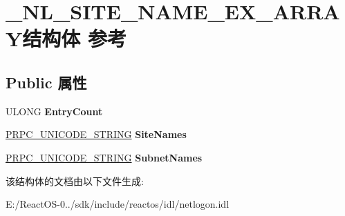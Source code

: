 \hypertarget{struct___n_l___s_i_t_e___n_a_m_e___e_x___a_r_r_a_y}{}\section{\+\_\+\+N\+L\+\_\+\+S\+I\+T\+E\+\_\+\+N\+A\+M\+E\+\_\+\+E\+X\+\_\+\+A\+R\+R\+A\+Y结构体 参考}
\label{struct___n_l___s_i_t_e___n_a_m_e___e_x___a_r_r_a_y}
\subsection*{Public 属性}
\begin{DoxyCompactItemize}
\item 
\mbox{\label{struct___n_l___s_i_t_e___n_a_m_e___e_x___a_r_r_a_y_af04cfa923a078b419e9539845ac56608}} 
U\+L\+O\+NG {\bfseries Entry\+Count}
\item 
\mbox{\label{struct___n_l___s_i_t_e___n_a_m_e___e_x___a_r_r_a_y_ac753a3063937407a9b497c4beb1a6771}} 
\hyperlink{struct___r_p_c___u_n_i_c_o_d_e___s_t_r_i_n_g}{P\+R\+P\+C\+\_\+\+U\+N\+I\+C\+O\+D\+E\+\_\+\+S\+T\+R\+I\+NG} {\bfseries Site\+Names}
\item 
\mbox{\label{struct___n_l___s_i_t_e___n_a_m_e___e_x___a_r_r_a_y_ae0849ea078820fda6cd42b3b1c6326d4}} 
\hyperlink{struct___r_p_c___u_n_i_c_o_d_e___s_t_r_i_n_g}{P\+R\+P\+C\+\_\+\+U\+N\+I\+C\+O\+D\+E\+\_\+\+S\+T\+R\+I\+NG} {\bfseries Subnet\+Names}
\end{DoxyCompactItemize}


该结构体的文档由以下文件生成\+:\begin{DoxyCompactItemize}
\item 
E\+:/\+React\+O\+S-\/0../sdk/include/reactos/idl/netlogon.\+idl\end{DoxyCompactItemize}
